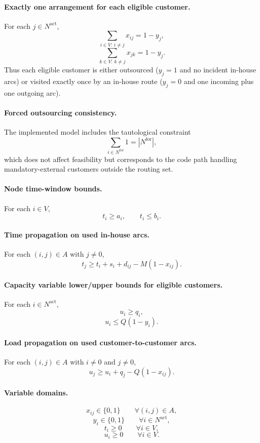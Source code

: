 \paragraph{Exactly one arrangement for each eligible customer.}
For each $j\in N^{\mathrm{act}}$,
\[
\sum_{i\in V:\, i\neq j} x_{ij} = 1 - y_j,
\]
\[
\sum_{k\in V:\, k\neq j} x_{jk} = 1 - y_j.
\]
Thus each eligible customer is either outsourced ($y_j=1$ and no incident in-house arcs) or visited exactly once by an in-house route ($y_j=0$ and one incoming plus one outgoing arc).

\paragraph{Forced outsourcing consistency.}
The implemented model includes the tautological constraint
\[
\sum_{i\in N^{\mathrm{for}}} 1 = |N^{\mathrm{for}}|,
\]
which does not affect feasibility but corresponds to the code path handling mandatory-external customers outside the routing set.

\paragraph{Node time-window bounds.}
For each $i\in V$,
\[
t_i \ge a_i,
\qquad
t_i \le b_i.
\]

\paragraph{Time propagation on used in-house arcs.}
For each $(i,j)\in A$ with $j\neq 0$,
\[
t_j \ge t_i + s_i + d_{ij} - M(1-x_{ij}).
\]

\paragraph{Capacity variable lower/upper bounds for eligible customers.}
For each $i\in N^{\mathrm{act}}$,
\[
u_i \ge q_i,
\]
\[
u_i \le Q(1-y_i).
\]

\paragraph{Load propagation on used customer-to-customer arcs.}
For each $(i,j)\in A$ with $i\neq 0$ and $j\neq 0$,
\[
u_j \ge u_i + q_j - Q(1-x_{ij}).
\]

\paragraph{Variable domains.}
\[
x_{ij}\in\{0,1\} \qquad \forall (i,j)\in A,
\]
\[
y_i\in\{0,1\} \qquad \forall i\in N^{\mathrm{act}},
\]
\[
t_i\ge 0 \qquad \forall i\in V,
\]
\[
u_i\ge 0 \qquad \forall i\in V.
\]

